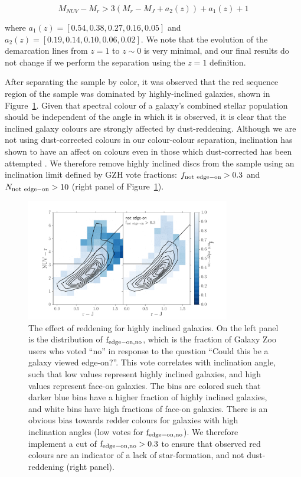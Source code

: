 \documentclass[useAMS,usenatbib]{mn2e}
\begin{document}
\begin{equation}
M_{NUV}-M_{r} > 3(M_{r}-M_{J} + a_{2}(z))+ a_{1}(z) + 1  
\end{equation}

\noindent where $a_{1}(z) = [0.54,0.38,0.27,0.16,0.05]$ and $a_{2}(z) = [0.19,0.14,0.10,0.06,0.02]$. 
We note that the evolution of the demarcation lines from $z=1$ to $z\sim0$ is very minimal, and our final results do not change if we perform the separation using the $z=1$ definition.

After separating the sample by color, it was observed that the red sequence region of the sample was dominated by highly-inclined galaxies, shown in Figure~\ref{fig:edgeon}. Given that spectral colour of a galaxy's combined stellar population should be independent of the angle in which it is observed, it is clear that the inclined galaxy colours are strongly affected by dust-reddening. Although we are not using dust-corrected colours in our colour-colour separation, inclination has shown to have an affect on colours even in those which dust-corrected has been attempted \citep{Morselli2016a,Devour2017}. We therefore remove highly inclined discs from the sample using an inclination limit defined by GZH vote fractions: $f_{\rm not~edge-on} > 0.3$ and $N_{\rm not~edge-on}>10$ (right panel of Figure~\ref{fig:edgeon}).  

\begin{figure}
\centering
\includegraphics[width=3.5in,trim={1cm 0cm 1cm 1cm},clip]{figures/edgeon_colorcolor.pdf}
\caption{The effect of reddening for highly inclined galaxies. On the left panel is the distribution of $\rm f_{edge-on,no}$, which is the fraction of Galaxy Zoo users who voted ``no'' in response to the question ``Could this be a galaxy viewed edge-on?''. This vote correlates with inclination angle, such that low values represent highly inclined galaxies, and high values represent face-on galaxies. The bins are colored such that darker blue bins have a higher fraction of highly inclined galaxies, and white bins have high fractions of face-on galaxies. There is an obvious bias towards redder colours for galaxies with high inclination angles (low votes for $\rm f_{edge-on,no}$). We therefore implement a cut of $\rm f_{edge-on,no}>0.3$ to ensure that observed red colours are an indicator of a lack of star-formation, and not dust-reddening (right panel). }
\label{fig:edgeon}
\end{figure}
\end{document}
